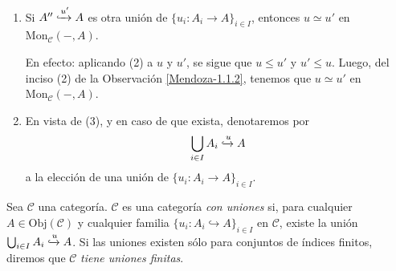\documentclass[tesis]{subfiles}
\begin{document}
\begin{Obs}
\begin{enumerate}[label=(\arabic*)]
        \item Si $A''\xhookrightarrow[]{u'} A$ es otra unión de $\{u_i:A_i\to A\}_{i\in I}$, entonces $u\simeq u'$ en $\text{Mon}_\mathscr{C}(-,A)$.

            En efecto: aplicando (2) a $u$ y $u'$, se sigue que $u\le u'$ y $u'\le u$. Luego, del inciso (2) de la Observación \ref{Mendoza-1.1.2}, tenemos que $u\simeq u'$ en $\text{Mon}_\mathscr{C}(-,A)$.

        \item En vista de (3), y en caso de que exista, denotaremos por
            \[
                \bigcup_{i\in I}A_i \xhookrightarrow{u} A
            \] 
            a la elección de una unión de $\{u_i:A_i\to A\}_{i\in I}$.
    \end{enumerate}
\end{Obs}

\begin{Def}\label{Def: Categoría con uniones}
    Sea $\mathscr{C}$ una categoría. $\mathscr{C}$ es una categoría \emph{con uniones} si, para cualquier $A\in\text{Obj}(\mathscr{C})$ y cualquier familia $\{u_i:A_i\hookrightarrow A\}_{i\in I}$ en $\mathscr{C}$, existe la unión $\bigcup_{i\in I}A_i\xhookrightarrow{u}A$. Si las uniones existen sólo para conjuntos de índices finitos, diremos que $\mathscr{C}$ \emph{tiene uniones finitas}.
\end{Def}
\end{document}
